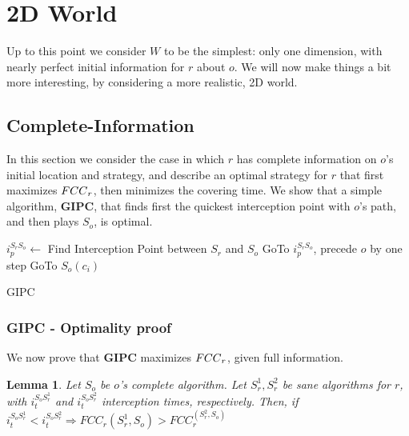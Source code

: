 \documentclass[a4paper,10pt]{article}
\newtheorem{lemma}[theorem]{Lemma}
\newcommand\rob{\ensuremath{r}\xspace}
\newcommand\opp{\ensuremath{o}\xspace}
\newcommand{\w}{\ensuremath{W}\xspace}
\newcommand{\fcc}{\ensuremath{FCC}\xspace}
\begin{document}
\newpage
\section{2D World}
Up to this point we consider \w to be the simplest: only one dimension, with nearly perfect initial information for \rob about \opp. We will now make things a bit more interesting, by considering a more realistic, 2D world.
\subsection{Complete-Information}
In this section we consider the case in which \rob has complete information on \opp's initial location and strategy, and describe an optimal strategy for \rob that first maximizes $\textnormal{\fcc}_r$, then minimizes the covering time. We show that a simple algorithm, \textbf{GIPC},  that finds first the quickest interception point with \opp's path, and then plays $S_{\opp}$, is optimal.

\begin{algorithm}
\begin{algorithmic}
	\STATE $i_p^{S_{\rob} S_{\opp}} \leftarrow $ Find Interception Point between $S_{\rob}$ and $S_{\opp}$
    \STATE GoTo $i_p^{S_{\rob} S_{\opp}}$, precede \opp by one step
    \LOOP
        	\STATE GoTo $S_{\opp}(c_i)$
        \ENDIF
    \ENDLOOP
  
\end{algorithmic}
\caption{GIPC\label{lss}}
\end{algorithm}

\subsubsection{\textbf{GIPC} - Optimality proof}\label{subsection:GIPC, optimality proof}
We now prove that \textbf{GIPC} maximizes $\textnormal{\fcc}_{\rob}$, given full information. 
\begin{lemma}\label{lemmas:GIPC optimality lower i_t higher FCC}
Let $S_{\opp}$ be \opp's complete algorithm. Let $S_{\rob}^1,S_{\rob}^2$ be sane algorithms for \rob, with $i_t^{S_{\opp} S_{\rob}^1}$ and $i_t^{S_{\opp} S_{\rob}^2}$ interception times, respectively. Then, if $i_t^{S_{\opp} S_{\rob}^1} < i_t^{S_{\opp} S_{\rob}^2}\Rightarrow \fcc_{\rob}(S_{\rob}^1, S_{\opp}) > \fcc_{\rob}^(S_{\rob}^2, S_{\opp})$
\end{lemma}
\end{document}

